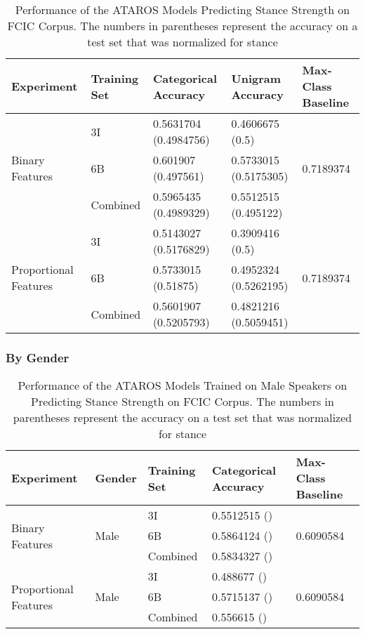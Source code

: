 \begin{table}[h]
\centering
\begin{tabular}{l | l | l | l | l  } 
	\textbf{Experiment}  & \textbf{Training Set} & \textbf{Categorical Accuracy} &  \textbf{Unigram Accuracy} & \textbf{Max-Class Baseline} \\ 
	\hline 
	\multirow{3}{*}{Binary Features}
		& 3I & \num{0.5631704} (\num{0.4984756}) & \num{0.4606675} (\num{0.5}) & \multirow{3}{*}{\num{0.7189374}} \\ 
	    & 6B & \num{0.601907} (\num{0.497561}) & \num{0.5733015} (\num{0.5175305}) & \\ 
	    & Combined & \num{0.5965435} (\num{0.4989329}) & \num{0.5512515} (\num{0.495122}) & \\  
	\hline
	\multirow{3}{*}{Proportional Features}
		& 3I & \num{0.5143027} (\num{0.5176829}) & \num{0.3909416} (\num{0.5}) & \multirow{3}{*}{\num{0.7189374}} \\ 
	    & 6B & \num{0.5733015} (\num{0.51875}) & \num{0.4952324} (\num{0.5262195}) & \\ 
	    & Combined & \num{0.5601907} (\num{0.5205793}) & \num{0.4821216} (\num{0.5059451}) & \\  
\end{tabular}	
\caption{Performance of the ATAROS Models Predicting Stance Strength on FCIC Corpus.  The numbers in parentheses represent the accuracy on a test set that was normalized for stance} 
\label{tab:fcic_acc_WVS_nodupes} 
\end{table}

\subsubsection*{By Gender} 

\begin{table}[h]
\centering
\begin{tabular}{l | l | l | l | l  } 
	\textbf{Experiment}  & \textbf{Gender} & \textbf{Training Set} & \textbf{Categorical Accuracy} &  \textbf{Max-Class Baseline} \\ 
	\hline
	\multirow{3}{*}{Binary Features} & 
	\multirow{3}{*}{Male} & 
		3I   & \num{0.5512515} (\num{}) & \multirow{3}{*}{\num{0.6090584}} \\ 
	    &&6B & \num{0.5864124} (\num{}) & \\ 
	    && Combined & \num{0.5834327} (\num{}) &  \\  
	\hline 
	\multirow{3}{*}{Proportional Features} & 
	\multirow{3}{*}{Male} & 
		3I   & \num{0.488677} (\num{}) & \multirow{3}{*}{\num{0.6090584}} \\ 
	    &&6B & \num{0.5715137} (\num{}) & \\ 
	    && Combined & \num{0.556615} (\num{}) &  \\  
\end{tabular}	
\caption{Performance of the ATAROS Models Trained on Male Speakers on Predicting Stance Strength on FCIC Corpus.  The numbers in parentheses represent the accuracy on a test set that was normalized for stance} 
\label{tab:fcic_acc_WVS_by_gender} 
\end{table}






